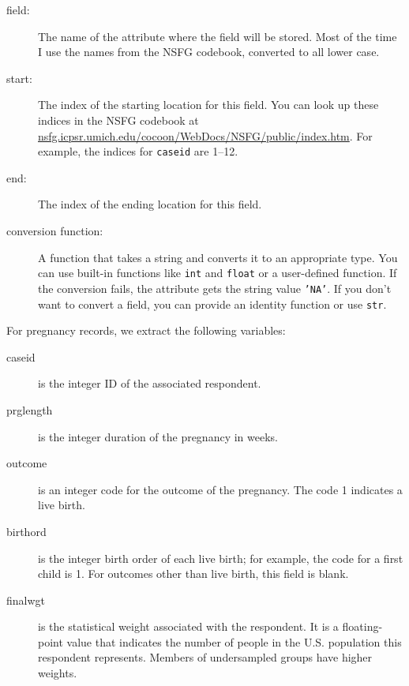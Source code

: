 \documentclass[10pt]{book}
\begin{document}
\begin{description}

\item[field:] The name of the attribute where the field
will be stored.  Most of the time I use the names from the
NSFG codebook, converted to all lower case.

\item[start:] The index of the starting location for this
field.  You can look up these indices in the NSFG codebook
at \url{nsfg.icpsr.umich.edu/cocoon/WebDocs/NSFG/public/index.htm}.
For example, the indices for {\tt caseid} are
1--12.

\item[end:] The index of the ending location for this
field.

\item[conversion function:] A function that takes a string
and converts it to an appropriate type.  You can use built-in
functions like {\tt int} and {\tt float} or a user-defined
function.  If the conversion fails, the attribute gets the
string value {\tt 'NA'}.  If you don't want to convert a
field, you can provide an identity function or use {\tt str}.

\end{description}

For pregnancy records, we extract the following variables:

\begin{description}

\item[caseid] is the integer ID of the associated respondent.

\item[prglength] is the integer duration of the pregnancy in weeks.

\item[outcome] is an integer code for the outcome of the pregnancy.
The code 1 indicates a live birth.

\item[birthord] is the integer birth order of each live birth;
for example, the code for a first child is 1. 
For outcomes other than live birth, this field is blank.

\item[finalwgt] is the statistical weight associated with the respondent.
It is a floating-point value that indicates the number of people in
the U.S. population this respondent represents.  Members of undersampled
groups have higher weights.

\end{description}
\end{document}
